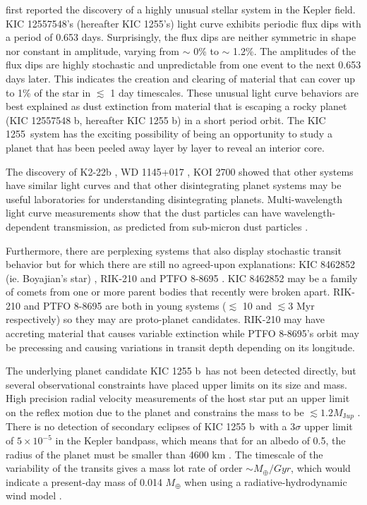 \documentclass[twocolumn]{aastex61}
\newcommand{\sha}{KIC 1255 b}
\newcommand{\shStar}{KIC 1255}
\begin{document}
\citet{rappaport} first reported the discovery of a highly unusual stellar system in the Kepler field.
KIC 12557548's (hereafter \shStar's) light curve exhibits periodic flux dips with a period of 0.653 days.
Surprisingly, the flux dips are neither symmetric in shape nor constant in amplitude, varying from $\sim$ 0\% to $\sim$ 1.2\%.
The amplitudes of the flux dips are highly stochastic and unpredictable from one event to the next 0.653 days later.
This indicates the creation and clearing of material that can cover up to 1\% of the star in $\lesssim$ 1 day timescales.
These unusual light curve behaviors are best explained as dust extinction from material that is escaping a rocky planet (KIC 12557548 b, hereafter \sha) in a short period orbit.
The \shStar\ system has the exciting possibility of being an opportunity to study a planet that has been peeled away layer by layer to reveal an interior core.

The discovery of K2-22b \citep{sanchis-ojedak2-22}, WD 1145+017 \citep{vanderburg2015wdDisintegrating}, KOI 2700 \citep{rappaport2014KOI2700} showed that other systems have similar light curves and that other disintegrating planet systems may be useful laboratories for understanding disintegrating planets.
Multi-wavelength light curve measurements show that the dust particles can have wavelength-dependent transmission, as predicted from sub-micron dust particles \citep{bochinski2015evolving,sanchis-ojedak2-22}.

Furthermore, there are perplexing systems that also display stochastic transit behavior but for which there are still no agreed-upon explanations: KIC 8462852 (ie. Boyajian's star) \citep{boyajian846}, RIK-210 \citep{david2017rik210} and PTFO 8-8695 \citep{vanEyken2012ptfTTauri}.
KIC 8462852 may be a family of comets from one or more parent bodies that recently were broken apart.
RIK-210 and PTFO 8-8695 are both in young systems ($\lesssim$ 10 and $\lesssim$3 Myr respectively) so they may are proto-planet candidates.
RIK-210 may have accreting material that causes variable extinction while PTFO 8-8695's orbit may be precessing and causing variations in transit depth depending on its longitude.

The underlying planet candidate \sha\ has not been detected directly, but several observational constraints have placed upper limits on its size and mass.
High precision radial velocity measurements of the host star put an upper limit on the reflex motion due to the planet and constrains the mass to be $\lesssim 1.2 M_{\mathrm Jup}$ \citep{croll2014}.
There is no detection of secondary eclipses of \sha\ with a 3$\sigma$ upper limit of $5 \times 10^{-5}$ in the Kepler bandpass, which means that for an albedo of 0.5, the radius of the planet must be smaller than 4600 km \citep{vanWerkhoven2014}.
The timescale of the variability of the transits gives a mass lot rate of order $\sim M_\oplus/Gyr$, which would indicate a present-day mass of 0.014 $M_\oplus$ when using a radiative-hydrodynamic wind model \citep{perez-becker}.
\end{document}
